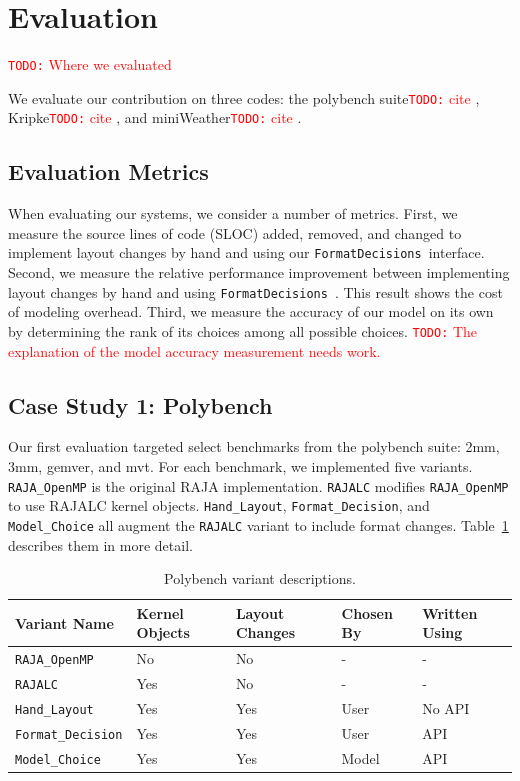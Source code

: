 \documentclass[sigconf, table]{acmart}
\newcommand{\todo}[1]{{\textcolor{red}{{\tt{TODO:}}\,\,#1 }}}
\newcommand{\nc}[0]{\todo{cite}}
\newcommand{\FormatDecisions}[0]{{\texttt{FormatDecisions}}~}
\begin{document}
\section{Evaluation}

\todo{Where we evaluated}

We evaluate our contribution on three codes: the polybench suite\nc, Kripke\nc, and miniWeather\nc.


\subsection{Evaluation Metrics}
When evaluating our systems, we consider a number of metrics. 
First,  we measure the source lines of code (SLOC) added, removed, and changed to implement layout changes by hand and using our \FormatDecisions interface.
Second, we measure the relative performance improvement between implementing layout changes by hand and using \FormatDecisions. 
This result shows the cost of modeling overhead.
Third, we measure the accuracy of our model on its own by determining the rank of its choices among all possible choices.
\todo{The explanation of the model accuracy measurement needs work.} 

\subsection{Case Study 1: Polybench}

Our first evaluation targeted select benchmarks from the polybench suite: 2mm, 3mm, gemver, and mvt.
For each benchmark, we implemented five variants.
\verb.RAJA_OpenMP. is the original RAJA implementation.
\verb.RAJALC. modifies \verb.RAJA_OpenMP. to use RAJALC kernel objects.
\verb.Hand_Layout., \verb.Format_Decision., and \verb.Model_Choice. all augment the \verb.RAJALC. variant to include format changes.
Table~\ref{VariantDescription} describes them in more detail.

\begin{table}
	\centering
	\begin{tabular}{ p{2.4cm} | p{1.1cm} | p{1.1cm} | p{1cm} | p{1cm}}
		Variant \linebreak Name & Kernel Objects & Layout Changes & Chosen \linebreak By & Written \linebreak Using \\
		\hline
		\verb.RAJA_OpenMP. & No & No & - & - \\
		\verb.RAJALC. & Yes & No & - & - \\
		\verb.Hand_Layout. & Yes & Yes & User & No API \\
		\verb.Format_Decision. & Yes & Yes & User & API \\
		\verb.Model_Choice. & Yes & Yes & Model & API
	\end{tabular}
	\caption{Polybench variant descriptions.}
	\label{VariantDescription}
\end{table}
\end{document}
